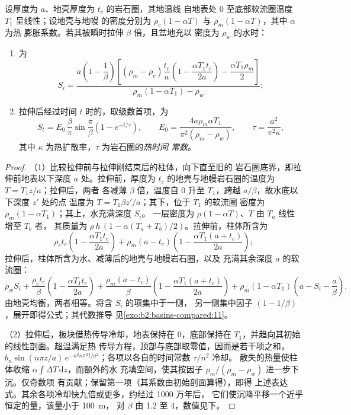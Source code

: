 \begin{proposition}[拉伸模型中的沉降]\label{prop:b2:basins-compared:stretching}
设厚度为 $a$、地壳厚度为 $t_c$ 的岩石圈，其地温线
自地表处 $0$ 至底部软流圈温度 $T_1$ 呈线性；设地壳与地幔
的密度分别为 $\rho_c(1 - \alpha T)$ 与 $\rho_m(1 - \alpha T)$，其中 $\alpha$ 为热
膨胀系数。若其被瞬时拉伸 $\beta$ 倍，且盆地充以
密度为 $\rho_w$ 的水时：
\begin{enumerate}
  \item {}为
  \[
    S_i = \frac{a\left(1 - \dfrac{1}{\beta}\right)\left[(\rho_m - \rho_c)\dfrac{t_c}{a}
          \left(1 - \dfrac{\alpha T_1 t_c}{2a}\right) - \dfrac{\alpha T_1 \rho_m}{2}\right]}
          {\rho_m(1 - \alpha T_1) - \rho_w};
  \]
  \item 拉伸后经过时间 $t$ 时的，取级数首项，为
  \[
    S_t = E_0\,\frac{\beta}{\pi}\sin\frac{\pi}{\beta}\left(1 - e^{-t/\tau}\right),\qquad
    E_0 = \frac{4a\rho_m\alpha T_1}{\pi^2(\rho_m - \rho_w)},\qquad
    \tau = \frac{a^2}{\pi^2\kappa},
  \]
  其中 $\kappa$ 为热扩散率，$\tau$ 为岩石圈的\emph{热时间
  常数}。
\end{enumerate}
\end{proposition}

\begin{proof}
（1）比较拉伸前与拉伸刚结束后的柱体，向下直至旧的
岩石圈底界，即拉伸前地表以下深度 $a$ 处。拉伸前，厚度为
$t_c$ 的地壳与地幔岩石圈的温度为 $T = T_1 z/a$；拉伸后，两者
各减薄 $\beta$ 倍，温度自 $0$ 升至 $T_1$，跨越 $a/\beta$，故水底以下深度 $z'$ 处的点
温度为 $T = T_1\beta z'/a$；其下，位于 $T_1$ 的软流圈
密度为 $\rho_m(1 - \alpha T_1)$；其上，水充满深度 $S_i$。
一层密度为 $\rho(1 - \alpha T)$、$T$ 由 $T_a$ 线性增至 $T_b$ 者，
其质量为 $\rho\,h\,(1 - \alpha(T_a + T_b)/2)$。拉伸前，柱体所含为
\[
  \rho_c t_c\left(1 - \frac{\alpha T_1 t_c}{2a}\right)
  + \rho_m (a - t_c)\left(1 - \frac{\alpha T_1 (a + t_c)}{2a}\right);
\]
拉伸后，柱体所含为水、减薄后的地壳与地幔岩石圈，以及
充满其余深度 $a$ 的软流圈：
\[
  \rho_w S_i + \frac{\rho_c t_c}{\beta}\left(1 - \frac{\alpha T_1 t_c}{2a}\right)
  + \frac{\rho_m (a - t_c)}{\beta}\left(1 - \frac{\alpha T_1 (a + t_c)}{2a}\right)
  + \rho_m(1 - \alpha T_1)\left(a - S_i - \frac{a}{\beta}\right).
\]
由地壳均衡，两者相等。将含 $S_i$ 的项集中于一侧，
另一侧集中因子 $(1 - 1/\beta)$，展开即得公式；其代数推导
见\cref{exo:b2:basins-compared:11}。

（2）拉伸后，板块借热传导冷却，地表保持在 $0$，底部保持在
$T_1$，并趋向其初始的线性剖面。超温满足热
传导方程，顶部与底部取零值，因而是若干项之和，
$b_n\sin(n\pi z/a)\,e^{-n^2\kappa\pi^2 t/a^2}$；各项以各自的时间常数 $\tau/n^2$ 冷却。
散失的热量使柱体收缩 $\alpha\int \Delta T\,\mathrm{d}z$，而额外的水
充填空间，使其按因子 $\rho_m/(\rho_m - \rho_w)$ 进一步下沉。仅奇数项
有贡献；保留第一项（其系数由初始剖面算得），即得
上述表达式。其余各项冷却快九倍或更多，约经过 1000 万年后，
它们使沉降平移一个近乎恒定的量，该量小于 \qty{100}{m}，
对 $\beta$ 由 1.2 至 4，数值见下。
\end{proof}

